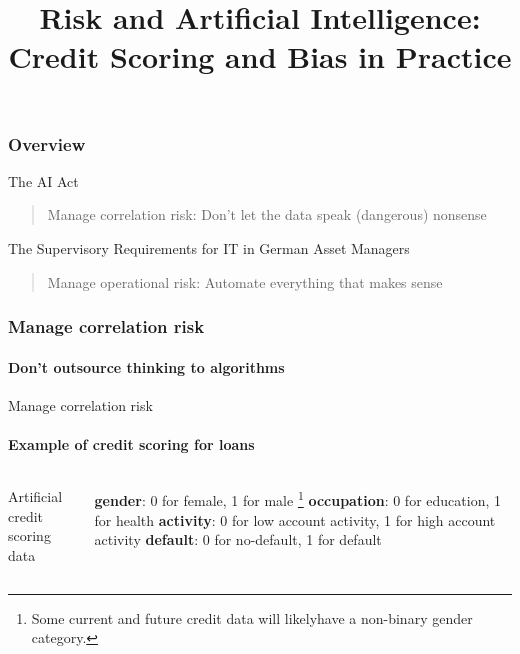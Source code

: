 

\title{Risk and Artificial Intelligence: Credit Scoring and Bias in Practice}

\maketitle

\begin{frame}
    \frametitle{Overview}
    \begin{block}{The AI Act}
        \begin{quote}
            Manage correlation risk: Don't let the data speak (dangerous) nonsense
        \end{quote}
    \end{block}
    \begin{block}{The Supervisory Requirements for IT in German Asset Managers}
        \begin{quote}
            Manage operational risk: Automate everything that makes sense
        \end{quote}
    \end{block}
\end{frame}

\begin{frame}
\frametitle{Manage correlation risk}
\framesubtitle{Don't outsource thinking to algorithms}
    \begin{center}
    \end{center}
\end{frame}

\begin{frame}{Manage correlation risk}
    \framesubtitle{Example of credit scoring for loans}
    \begin{columns}[T] %
        \begin{column}{.4\textwidth}
            Artificial credit scoring data
            \newline\newline
            \newline
        \end{column}%
        \begin{column}{.4\textwidth}
            \textbf{gender}: 0 for female, 1 for male \footnote{
                Some current and future credit data will likely\newline have a non-binary gender category.
            } \newline
            \textbf{occupation}: 0 for education, 1 for health \newline
            \textbf{activity}: 0 for low account activity, 1 for high account activity \newline
            \textbf{default}: 0 for no-default, 1 for default \newline
        \end{column}%
        \end{columns}
\end{frame}

